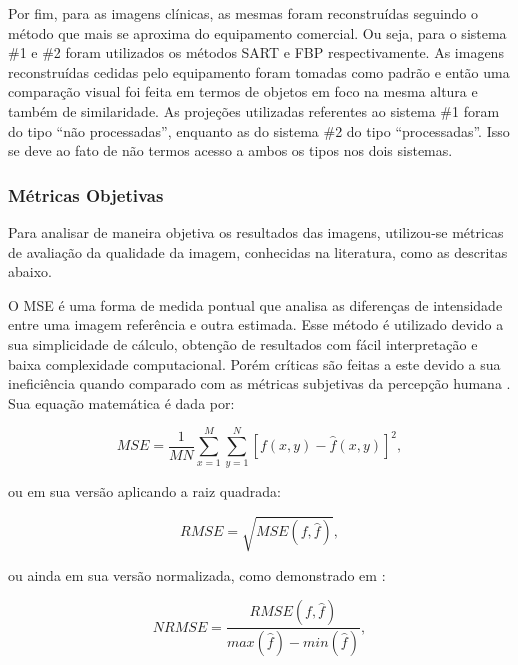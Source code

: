 Por fim, para as imagens clínicas, as mesmas foram reconstruídas seguindo o método que mais se aproxima do equipamento comercial. Ou seja, para o sistema \#1 e \#2 foram utilizados os métodos \acs{SART} e \acs{FBP} respectivamente. As imagens reconstruídas cedidas pelo equipamento foram tomadas como padrão e então uma comparação visual foi feita em termos de objetos em foco na mesma altura e também de similaridade. As projeções utilizadas referentes ao sistema \#1 foram do tipo ``não processadas'', enquanto as do sistema \#2 do tipo ``processadas''. Isso se deve ao fato de não termos acesso a ambos os tipos nos dois sistemas.  


\subsubsection{Métricas Objetivas} 

Para analisar de maneira objetiva os resultados das imagens, utilizou-se métricas de avaliação da qualidade da imagem, conhecidas na literatura, como as descritas abaixo.

O  \acs{MSE} é uma forma de medida pontual que analisa as diferenças de intensidade entre uma imagem referência e outra estimada. Esse método é utilizado devido a sua simplicidade de cálculo, obtenção de resultados com fácil interpretação e baixa complexidade computacional. Porém críticas são feitas a este devido a sua ineficiência quando comparado com as métricas subjetivas da percepção humana \cite{gonzalez2008digital,wang2004image}. Sua equação matemática é dada por:

\begin{equation}
MSE = \dfrac{1}{MN} \sum_{x=1}^{M} \sum_{y=1}^{N} [f(x,y) - \hat{f}(x,y)]^{2},
\label{eq:eqCap4MSE}
\end{equation} 

\noindent ou em sua versão aplicando a raiz quadrada:

\begin{equation}
RMSE = \sqrt{MSE(f,\hat{f})},
\label{eq:eqCap4RMSE}
\end{equation}
 
\noindent ou ainda em sua versão normalizada, como demonstrado em :

\begin{equation}
NRMSE = \dfrac{RMSE(f,\hat{f})}{max(\hat{f}) - min(\hat{f})},
\label{eq:eqCap4NRMSE}
\end{equation}

%


